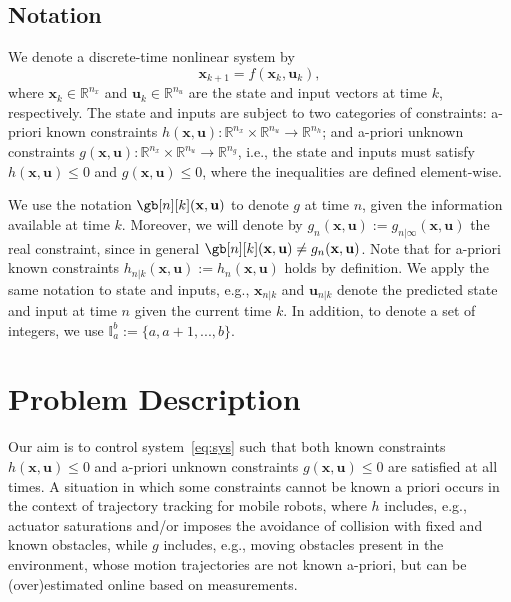 \documentclass[journal]{IEEEtran}
\newcommand{\x}{{\mathbf{x}}}
\renewcommand{\u}{{\mathbf{u}}}
\begin{document}
	
	
	
	\subsection{Notation}
	We denote a discrete-time nonlinear system by
	\begin{equation}\label{eq:sys}
	\x_{k+1}=f(\x_k,\u_k),
	\end{equation}
	where $\x_k\in\mathbb{R}^{n_x}$ and $\u_k\in\mathbb{R}^{n_u}$ are the state and input vectors at time $k$, respectively. The state and inputs are subject to two categories of constraints: a-priori known constraints $h(\x,\u):\mathbb{R}^{n_x}\times\mathbb{R}^{n_u}\rightarrow\mathbb{R}^{n_h}$; and a-priori unknown constraints $g(\x,\u):\mathbb{R}^{n_x}\times\mathbb{R}^{n_u}\rightarrow\mathbb{R}^{n_g}$, i.e., the state and inputs must satisfy $h(\x,\u)\leq{}0$ and $g(\x,\u)\leq{}0$, where the inequalities are defined element-wise.
	
	We use the notation $\gb[n][k](\x,\u)$ to denote $g$ at time $n$, given the information available at time $k$. Moreover, we will denote by $g_n(\x,\u):=g_{n|\infty}(\x,\u)$ the real constraint, since in general $\gb[n][k](\x,\u)\neq g_n(\x,\u)$. Note that for a-priori known constraints $h_{n|k}(\x,\u):=h_n(\x,\u)$ holds by definition. We apply the same notation to state and inputs, e.g., $\x_{n|k}$ and $\u_{n|k}$ denote the predicted state and input at time $n$ given the current time $k$. In addition, to denote a set of integers, we use $\mathbb{I}_{a}^{b} := \{a,a+1,...,b\}$.
	

	


	\section{Problem Description}\label{sec:problem_description}
	
	Our aim is to control system~\eqref{eq:sys} such that both known constraints $h(\x,\u)\leq{}0$ and a-priori unknown constraints $g(\x,\u)\leq{}0$ are satisfied at all times. A situation in which some constraints cannot be known a priori occurs in the context of trajectory tracking for mobile robots, where $h$ includes, e.g., actuator saturations and/or imposes the avoidance of collision with fixed and known obstacles, while $g$ includes, e.g., moving obstacles present in the environment, whose motion trajectories are not known a-priori, but can be (over)estimated online based on measurements.
	
\end{document}

